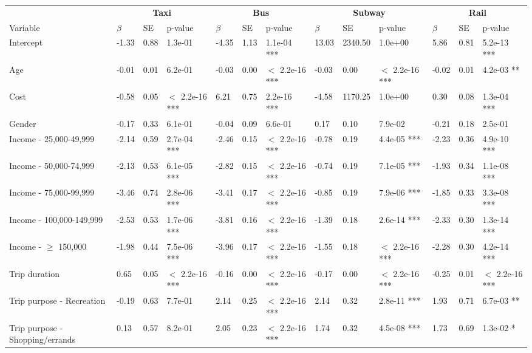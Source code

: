 \documentclass{article}\usepackage[utf8]{inputenc}
\begin{document}
\begin{table}[H]
\begin{tabular}{lllllllllllll}
\toprule
\multicolumn{1}{c}{\textbf{ }} & \multicolumn{3}{c}{\textbf{Taxi}} & \multicolumn{3}{c}{\textbf{Bus}} & \multicolumn{3}{c}{\textbf{Subway}} & \multicolumn{3}{c}{\textbf{Rail}} \\
\cmidrule(l{3pt}r{3pt}){2-4} \cmidrule(l{3pt}r{3pt}){5-7} \cmidrule(l{3pt}r{3pt}){8-10} \cmidrule(l{3pt}r{3pt}){11-13}
Variable & $\beta$ & SE & p-value & $\beta$ & SE & p-value & $\beta$ & SE & p-value & $\beta$ & SE & p-value\\
\midrule
Intercept & -1.33 & 0.88 & 1.3e-01 & -4.35 & 1.13 & 1.1e-04 *** & 13.03 & 2340.50 & 1.0e+00 & 5.86 & 0.81 & 5.2e-13 ***\\
Age & -0.01 & 0.01 & 6.2e-01 & -0.03 & 0.00 & $<$ 2.2e-16 *** & -0.03 & 0.00 & $<$ 2.2e-16 *** & -0.02 & 0.01 & 4.2e-03 **\\
Cost & -0.58 & 0.05 & $<$ 2.2e-16 *** & 6.21 & 0.75 & 2.2e-16 *** & -4.58 & 1170.25 & 1.0e+00 & 0.30 & 0.08 & 1.3e-04 ***\\
Gender & -0.17 & 0.33 & 6.1e-01 & -0.04 & 0.09 & 6.6e-01 & 0.17 & 0.10 & 7.9e-02 & -0.21 & 0.18 & 2.5e-01\\
Income - 25,000-49,999 & -2.14 & 0.59 & 2.7e-04 *** & -2.46 & 0.15 & $<$ 2.2e-16 *** & -0.78 & 0.19 & 4.4e-05 *** & -2.23 & 0.36 & 4.9e-10 ***\\
Income - 50,000-74,999 & -2.13 & 0.53 & 6.1e-05 *** & -2.82 & 0.15 & $<$ 2.2e-16 *** & -0.74 & 0.19 & 7.1e-05 *** & -1.93 & 0.34 & 1.1e-08 ***\\
Income - 75,000-99,999 & -3.46 & 0.74 & 2.8e-06 *** & -3.41 & 0.17 & $<$ 2.2e-16 *** & -0.85 & 0.19 & 7.9e-06 *** & -1.85 & 0.33 & 3.3e-08 ***\\
Income - 100,000-149,999 & -2.53 & 0.53 & 1.7e-06 *** & -3.81 & 0.16 & $<$ 2.2e-16 *** & -1.39 & 0.18 & 2.6e-14 *** & -2.33 & 0.30 & 1.3e-14 ***\\
Income - $\geq$ 150,000 & -1.98 & 0.44 & 7.5e-06 *** & -3.96 & 0.17 & $<$ 2.2e-16 *** & -1.55 & 0.18 & $<$ 2.2e-16 *** & -2.28 & 0.30 & 4.2e-14 ***\\
Trip duration & 0.65 & 0.05 & $<$ 2.2e-16 *** & -0.16 & 0.00 & $<$ 2.2e-16 *** & -0.17 & 0.00 & $<$ 2.2e-16 *** & -0.25 & 0.01 & $<$ 2.2e-16 ***\\
Trip purpose - Recreation & -0.19 & 0.63 & 7.7e-01 & 2.14 & 0.25 & $<$ 2.2e-16 *** & 2.14 & 0.32 & 2.8e-11 *** & 1.93 & 0.71 & 6.7e-03 **\\
Trip purpose - Shopping/errands & 0.13 & 0.57 & 8.2e-01 & 2.05 & 0.23 & $<$ 2.2e-16 *** & 1.74 & 0.32 & 4.5e-08 *** & 1.73 & 0.69 & 1.3e-02 *\\

\end{tabular}
\end{table}
\end{document}
